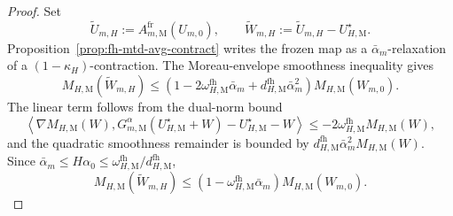 \documentclass{article}
\begin{document}
\begin{proof}
Set
\begin{equation}
\widetilde U_{m,H}:=A_{m,\mathrm M}^{\mathrm{fr}}(U_{m,0}),\qquad
\widetilde W_{m,H}:=\widetilde U_{m,H}-U_{H,\mathrm M}^\star.
\end{equation}
Proposition~\ref{prop:fh-mtd-avg-contract} writes the frozen map as a $\bar\alpha_m$-relaxation of a $(1-\kappa_H)$-contraction. The Moreau-envelope smoothness inequality gives
\begin{equation}
M_{H,\mathrm M}(\widetilde W_{m,H})\le\left(1-2\omega_{H,\mathrm M}^{\mathrm{fh}}\bar\alpha_m+d_{H,\mathrm M}^{\mathrm{fh}}\bar\alpha_m^2\right)M_{H,\mathrm M}(W_{m,0}).
\end{equation}
The linear term follows from the dual-norm bound
\begin{equation}
\left\langle\nabla M_{H,\mathrm M}(W),G_{m,\mathrm M}^\alpha(U_{H,\mathrm M}^\star+W)-U_{H,\mathrm M}^\star-W\right\rangle\le-2\omega_{H,\mathrm M}^{\mathrm{fh}}M_{H,\mathrm M}(W),
\end{equation}
and the quadratic smoothness remainder is bounded by $d_{H,\mathrm M}^{\mathrm{fh}}\bar\alpha_m^2M_{H,\mathrm M}(W)$. Since $\bar\alpha_m\le H\alpha_0\le\omega_{H,\mathrm M}^{\mathrm{fh}}/d_{H,\mathrm M}^{\mathrm{fh}}$,
\begin{equation}
M_{H,\mathrm M}(\widetilde W_{m,H})\le\left(1-\omega_{H,\mathrm M}^{\mathrm{fh}}\bar\alpha_m\right)M_{H,\mathrm M}(W_{m,0}).
\end{equation}


\end{proof}
\end{document}

